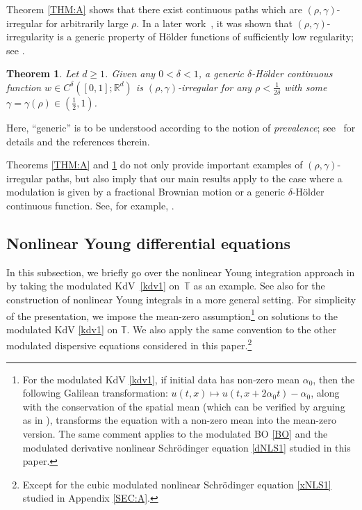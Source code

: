 \documentclass[letterpaper, 11pt,  reqno]{amsart}
\newtheorem{oldtheorem}{Theorem}
\newcommand{\1}{\hspace{0.5mm}\text{I}\hspace{0.5mm}}
\newcommand{\R}{\mathbb{R}}
\newcommand{\T}{\mathbb{T}}
\newcommand{\al}{\alpha}
\newcommand{\dl}{\delta}
\newcommand{\g}{\gamma}
\numberwithin{equation}{section}
\numberwithin{theorem}{section}
\begin{document}
Theorem \ref{THM:A}
shows that there exist continuous paths which are $(\rho, \g)$-irregular for arbitrarily large $\rho$. 
In a later work~\cite{GG}, it was shown  that $(\rho,\g)$-irregularity is a generic property of H\"older functions of sufficiently low regularity; see \cite[p.\,2418 and Theorem 3.1]{GG}.

\begin{oldtheorem}
\label{THM:B}
Let  $d \ge 1$.
Given  any $0 < \delta < 1$, 
a generic $\dl$-H\"older continuous  function $w \in C^\delta([0,1];\R^d)$ 
 is $(\rho,\g)$-irregular for any $\rho < \frac1{2\delta}$ with  some $\gamma = \gamma(\rho) \in (\frac 12,1)$.
\end{oldtheorem}


Here, ``generic'' is to be understood according to the notion of {\it prevalence}; see~\cite{GG} for details and the  references therein.




Theorems \ref{THM:A} and \ref{THM:B}
do not only provide important examples of $(\rho, \g)$-irregular paths, 
but also imply that 
 our main results
apply 
to the case
where a modulation is given by a fractional Brownian motion
or a generic  $\dl$-H\"older continuous function.
See, for example, \cite[Corollary~1.5]{CGLLO1}.









\subsection{Nonlinear Young differential equations}
\label{SUBSEC:YDE}





In this subsection, 
we briefly go over the nonlinear Young integration approach
in \cite{CGLLO1}
by taking the modulated 
 KdV~\eqref{kdv1} on~$\T$
 as an example.
See also \cite{HK, G23}
for the construction of nonlinear Young integrals in a more general setting.
For simplicity of the presentation, 
we impose
the mean-zero assumption\footnote{For the modulated KdV \eqref{kdv1}, 
if initial data has non-zero mean $\al_0$, then the following Galilean transformation:
$u(t, x)\mapsto u (t, x + 2\al_0t)-\al_0$, 
along with the conservation of the spatial mean (which can be verified
by arguing as in \cite[Section 6]{CGLLO1}), 
transforms
the equation with a non-zero mean into the mean-zero version.
The same comment applies
to the modulated BO \eqref{BO} and the modulated derivative nonlinear
Schr\"odinger equation \eqref{dNLS1}
studied in this paper.
}
 on solutions to
the modulated KdV \eqref{kdv1}
on $\T$.
We also apply the same convention
to  the other modulated dispersive equations 
considered in this paper.\footnote{Except for the cubic modulated nonlinear Schr\"odinger equation
\eqref{xNLS1}
studied in Appendix \ref{SEC:A}.}
\end{document}
